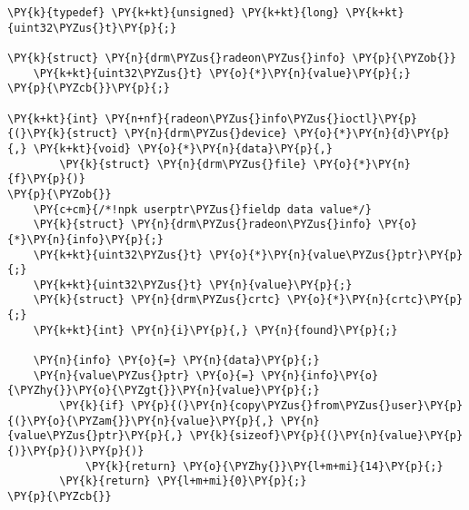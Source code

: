\begin{Verbatim}[commandchars=\\\{\}]
\PY{k}{typedef} \PY{k+kt}{unsigned} \PY{k+kt}{long} \PY{k+kt}{uint32\PYZus{}t}\PY{p}{;}

\PY{k}{struct} \PY{n}{drm\PYZus{}radeon\PYZus{}info} \PY{p}{\PYZob{}}
    \PY{k+kt}{uint32\PYZus{}t} \PY{o}{*}\PY{n}{value}\PY{p}{;}
\PY{p}{\PYZcb{}}\PY{p}{;}

\PY{k+kt}{int} \PY{n+nf}{radeon\PYZus{}info\PYZus{}ioctl}\PY{p}{(}\PY{k}{struct} \PY{n}{drm\PYZus{}device} \PY{o}{*}\PY{n}{d}\PY{p}{,} \PY{k+kt}{void} \PY{o}{*}\PY{n}{data}\PY{p}{,}
        \PY{k}{struct} \PY{n}{drm\PYZus{}file} \PY{o}{*}\PY{n}{f}\PY{p}{)}
\PY{p}{\PYZob{}}
	\PY{c+cm}{/*!npk userptr\PYZus{}fieldp data value*/}
	\PY{k}{struct} \PY{n}{drm\PYZus{}radeon\PYZus{}info} \PY{o}{*}\PY{n}{info}\PY{p}{;}
	\PY{k+kt}{uint32\PYZus{}t} \PY{o}{*}\PY{n}{value\PYZus{}ptr}\PY{p}{;}
	\PY{k+kt}{uint32\PYZus{}t} \PY{n}{value}\PY{p}{;}
	\PY{k}{struct} \PY{n}{drm\PYZus{}crtc} \PY{o}{*}\PY{n}{crtc}\PY{p}{;}
	\PY{k+kt}{int} \PY{n}{i}\PY{p}{,} \PY{n}{found}\PY{p}{;}

	\PY{n}{info} \PY{o}{=} \PY{n}{data}\PY{p}{;}
	\PY{n}{value\PYZus{}ptr} \PY{o}{=} \PY{n}{info}\PY{o}{\PYZhy{}}\PY{o}{\PYZgt{}}\PY{n}{value}\PY{p}{;}
        \PY{k}{if} \PY{p}{(}\PY{n}{copy\PYZus{}from\PYZus{}user}\PY{p}{(}\PY{o}{\PYZam{}}\PY{n}{value}\PY{p}{,} \PY{n}{value\PYZus{}ptr}\PY{p}{,} \PY{k}{sizeof}\PY{p}{(}\PY{n}{value}\PY{p}{)}\PY{p}{)}\PY{p}{)}
            \PY{k}{return} \PY{o}{\PYZhy{}}\PY{l+m+mi}{14}\PY{p}{;}
        \PY{k}{return} \PY{l+m+mi}{0}\PY{p}{;}
\PY{p}{\PYZcb{}}
\end{Verbatim}
